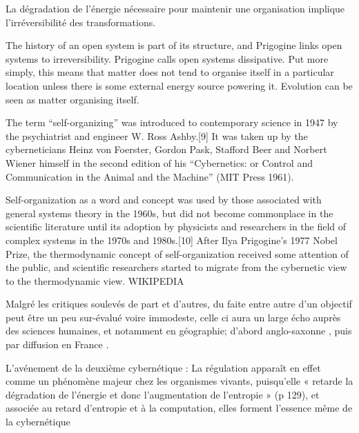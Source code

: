 La dégradation de l'énergie nécessaire pour maintenir une organisation implique l'irréversibilité des transformations.


The history of an open system is part of its structure, and Prigogine links open systems to irreversibility. Prigogine calls open systems dissipative. Put more simply, this means that matter does not tend to organise itself in a particular location unless there is some external energy source powering it. Evolution can be seen as matter organising itself.


The term \enquote{self-organizing} was introduced to contemporary science in 1947 by the psychiatrist and engineer W. Ross Ashby.[9] It was taken up by the cyberneticians Heinz von Foerster, Gordon Pask, Stafford Beer and Norbert Wiener himself in the second edition of his \enquote{Cybernetics: or Control and Communication in the Animal and the Machine} (MIT Press 1961).

Self-organization as a word and concept was used by those associated with general systems theory in the 1960s, but did not become commonplace in the scientific literature until its adoption by physicists and researchers in the field of complex systems in the 1970s and 1980s.[10] After Ilya Prigogine's 1977 Nobel Prize, the thermodynamic concept of self-organization received some attention of the public, and scientific researchers started to migrate from the cybernetic view to the thermodynamic view. WIKIPEDIA


Malgré les critiques soulevés de part et d'autres, du faite entre autre d'un objectif peut être un peu sur-évalué voire immodeste, celle ci aura un large écho auprès des sciences humaines, et notamment en géographie; d'abord anglo-saxonne \autocite{Haggett1965, Chorley1962}, puis par diffusion en France \autocite{Raymond}.



L'avénement de la deuxième cybernétique : 
La régulation apparaît en effet comme un phénomène majeur chez les organismes vivants, puisqu’elle « retarde la dégradation de l’énergie et donc l’augmentation de l’entropie » (p 129), et associée au retard d’entropie et à la computation, elles forment l’essence même de la cybernétique


\printbibliography[heading=subbibliography]

\stopcontents[chapters]
